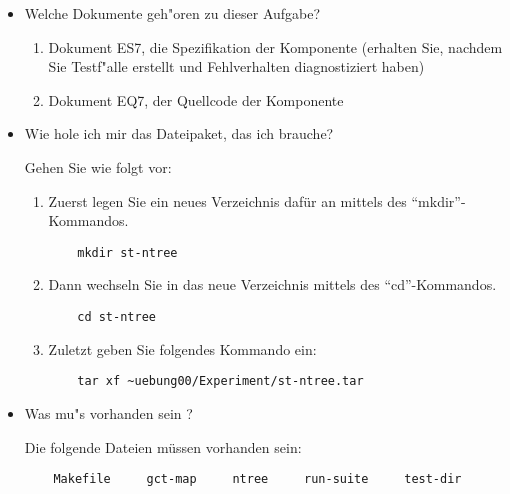 \begin{itemize}

\item Welche Dokumente geh"oren zu dieser Aufgabe?

\begin{enumerate}
\item Dokument ES7, die Spezifikation der Komponente (erhalten Sie, nachdem
   Sie Testf"alle erstellt und Fehlverhalten diagnostiziert haben)
\item Dokument EQ7, der Quellcode der Komponente
\end{enumerate}

\item Wie hole ich mir das Dateipaket, das ich brauche?

Gehen Sie wie folgt vor:

\begin{enumerate}

\item Zuerst legen Sie ein neues Verzeichnis daf\"ur an mittels des 
"`mkdir"'-Kommandos.
\begin{verbatim}
    mkdir st-ntree
\end{verbatim}

\item Dann wechseln Sie in das neue Verzeichnis mittels des 
"`cd"'-Kommandos.
\begin{verbatim}
    cd st-ntree
\end{verbatim}

\item Zuletzt geben Sie folgendes Kommando ein:
\begin{verbatim}
    tar xf ~uebung00/Experiment/st-ntree.tar
\end{verbatim}

\end{enumerate}

\item Was mu"s vorhanden sein ?

Die folgende Dateien m\"ussen vorhanden sein:
\begin{verbatim}
    Makefile     gct-map     ntree     run-suite     test-dir
\end{verbatim}


\end{itemize}


